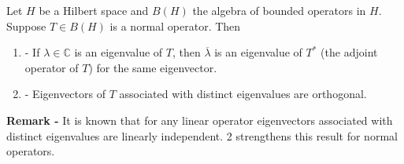 \documentclass[12pt]{article}
\begin{document}
Let $H$ be a Hilbert space and $B(H)$ the algebra of bounded operators in $H$. Suppose $T \in B(H)$ is a normal operator. Then

\begin{enumerate}
\item - If $\lambda \in \mathbb{C}$ is an eigenvalue of $T$, then $\overline{\lambda}$ is an eigenvalue of $T^*$ (the adjoint operator of $T$) for the same eigenvector.

\item - Eigenvectors of $T$ associated with distinct eigenvalues are orthogonal.

\end{enumerate}


{\bf Remark -} It is known that for any linear operator eigenvectors associated with distinct eigenvalues are linearly independent.  2 strengthens this result for normal operators.
\end{document}
